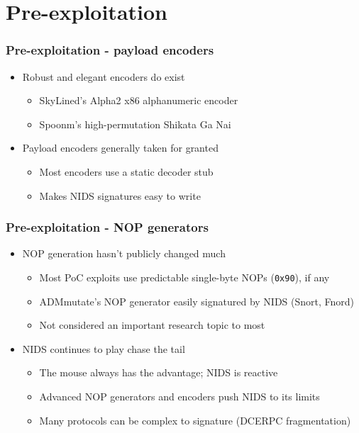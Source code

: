 \documentclass{beamer}
\newenvironment{sitemize}{\vspace{1mm}\begin{itemize}\itemsep 4pt\small}{\end{itemize}}
\begin{document}
\section{Pre-exploitation}
\begin{frame}[t]
    \frametitle{Pre-exploitation - payload encoders}

    \begin{sitemize}
        \item Robust and elegant encoders do exist
        \begin{sitemize}
            \item SkyLined's Alpha2 x86 alphanumeric encoder
            \item Spoonm's high-permutation Shikata Ga Nai
        \end{sitemize}

        \pause
        \item Payload encoders generally taken for granted
        \begin{sitemize}
            \item Most encoders use a static decoder stub
            \item Makes NIDS signatures easy to write
        \end{sitemize}
    \end{sitemize}
\end{frame}

\begin{frame}[t]
    \frametitle{Pre-exploitation - NOP generators}

    \begin{sitemize}
        \item NOP generation hasn't publicly changed much
        \begin{sitemize}
            \item Most PoC exploits use predictable single-byte NOPs (\texttt{0x90}), if any
            \item ADMmutate's NOP generator easily signatured by NIDS (Snort, Fnord)
            \item Not considered an important research topic to most
        \end{sitemize}

        \pause
        \item NIDS continues to play chase the tail
        \begin{sitemize}
            \item The mouse always has the advantage; NIDS is reactive
            \item Advanced NOP generators and encoders push NIDS to its limits
            \item Many protocols can be complex to signature (DCERPC fragmentation)
        \end{sitemize}
    \end{sitemize}
\end{frame}
\end{document}
